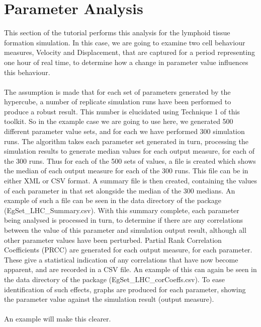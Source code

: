 \documentclass[a4paper,11pt]{article}
\begin{document}
\section{Parameter Analysis}
\noindent This section of the tutorial performs this analysis for the lymphoid tissue formation simulation.  In this case, we are going to examine two cell behaviour measures, Velocity and Displacement, that are captured for a period representing one hour of real time, to determine how a change in parameter value influences this behaviour.\\
\\
The assumption is made that for each set of parameters generated by the hypercube, a number of replicate simulation runs have been performed to produce a robust result. This number is elucidated using Technique 1 of this toolkit. So in the example case we are going to use here, we generated 500 different parameter value sets, and for each we have performed 300 simulation runs. The algorithm takes each parameter set generated in turn, processing the simulation results to generate median values for each output measure, for each of the 300 runs. Thus for each of the 500 sets of values, a file is created which shows the median of each output measure for each of the 300 runs. This file can be in either XML or CSV format. A summary file is then created, containing the values of each parameter in that set alongside the median of the 300 medians. An example of such a file can be seen in the data directory of the package (EgSet\_LHC\_Summary.csv). With this summary complete, each parameter being analysed is processed in turn, to determine if there are any correlations between the value of this parameter and simulation output result, although all other parameter values have been perturbed.  Partial Rank Correlation Coefficients (PRCC) are generated for each output measure, for each parameter. These give a statistical indication of any correlations that have now become apparent, and are recorded in a CSV file. An example of this can again be seen in the data directory of the package (EgSet\_LHC\_corCoeffs.csv). To ease identification of such effects, graphs are produced for each parameter, showing the parameter value against the simulation result (output measure).\\
\\
An example will make this clearer.
\end{document}
